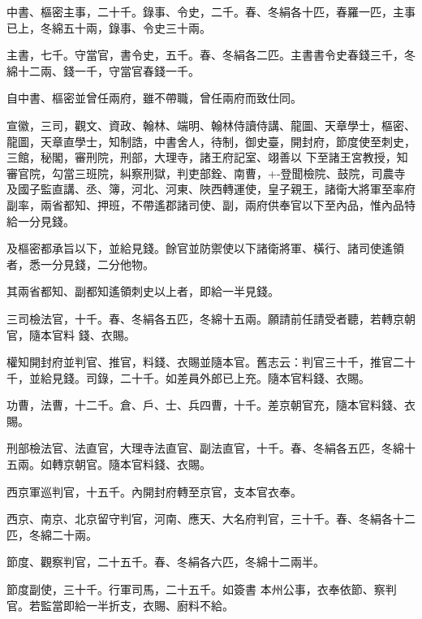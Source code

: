 \begin{pinyinscope}
 中書、樞密主事，二十千。錄事、令史，二千。春、冬絹各十匹，春羅一匹，主事已上，冬綿五十兩，錄事、令史三十兩。



 主書，七千。守當官，書令史，五千。春、冬絹各二匹。主書書令史春錢三千，冬綿十二兩、錢一千，守當官春錢一千。



 自中書、樞密並曾任兩府，雖不帶職，曾任兩府而致仕同。



 宣徽，三司，觀文、資政、翰林、端明、翰林侍讀侍講、龍圖、天章學士，樞密、龍圖，天章直學士，知制誥，中書舍人，待制，御史臺，開封府，節度使至刺史，三館，秘閣，審刑院，刑部，大理寺，諸王府記室、翊善以
 下至諸王宮教授，知審官院，勾當三班院，糾察刑獄，判吏部銓、南曹，+-登聞檢院、鼓院，司農寺及國子監直講、丞、簿，河北、河東、陜西轉運使，皇子親王，諸衛大將軍至率府副率，兩省都知、押班，不帶遙郡諸司使、副，兩府供奉官以下至內品，惟內品特給一分見錢。



 及樞密都承旨以下，並給見錢。餘官並防禦使以下諸衛將軍、橫行、諸司使遙領者，悉一分見錢，二分他物。



 其兩省都知、副都知遙領刺史以上者，即給一半見錢。



 三司檢法官，十千。春、冬絹各五匹，冬綿十五兩。願請前任請受者聽，若轉京朝官，隨本官料
 錢、衣賜。



 權知開封府並判官、推官，料錢、衣賜並隨本官。舊志云：判官三十千，推官二十千，並給見錢。司錄，二十千。如差員外郎已上充。隨本官料錢、衣賜。



 功曹，法曹，十二千。倉、戶、士、兵四曹，十千。差京朝官充，隨本官料錢、衣賜。



 刑部檢法官、法直官，大理寺法直官、副法直官，十千。春、冬絹各五匹，冬綿十五兩。如轉京朝官。隨本官料錢、衣賜。



 西京軍巡判官，十五千。內開封府轉至京官，支本官衣奉。



 西京、南京、北京留守判官，河南、應天、大名府判官，三十千。春、冬絹各十二匹，冬綿二十兩。



 節度、觀察判官，二十五千。春、冬絹各六匹，冬綿十二兩半。



 節度副使，三十千。行軍司馬，二十五千。如簽書
 本州公事，衣奉依節、察判官。若監當即給一半折支，衣賜、廚料不給。




\end{pinyinscope}
